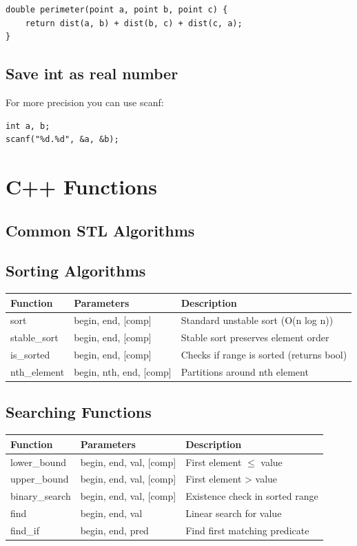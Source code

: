 \documentclass[10pt]{article}
\begin{document}
\begin{multicols*}{2}
\begin{lstlisting}[style=compactcpp]
double perimeter(point a, point b, point c) {
    return dist(a, b) + dist(b, c) + dist(c, a);
}
\end{lstlisting}

\subsection{Save int as real number}
For more precision you can use scanf:
\begin{lstlisting}[style=compactcpp]
int a, b;
scanf("%d.%d", &a, &b);
\end{lstlisting}

\section{C++ Functions}
\subsection{Common STL Algorithms}

\subsection*{Sorting Algorithms}
\begin{tabularx}{\linewidth}{|l|l|X|}
    \hline
    \textbf{Function} & \textbf{Parameters} & \textbf{Description} \\
    \hline
    sort & begin, end, [comp] & Standard unstable sort (O(n log n)) \\
    \hline
    stable\_sort & begin, end, [comp] & Stable sort preserves element order \\
    \hline
    is\_sorted & begin, end, [comp] & Checks if range is sorted (returns bool) \\
    \hline
    nth\_element & begin, nth, end, [comp] & Partitions around nth element \\
    \hline
\end{tabularx}

\subsection*{Searching Functions}
\begin{tabularx}{\linewidth}{|l|l|X|}
    \hline
    \textbf{Function} & \textbf{Parameters} & \textbf{Description} \\
    \hline
    lower\_bound & begin, end, val, [comp] & First element $\leq$ value \\
    \hline
    upper\_bound & begin, end, val, [comp] & First element > value \\
    \hline
    binary\_search & begin, end, val, [comp] & Existence check in sorted range \\
    \hline
    find & begin, end, val & Linear search for value \\
    \hline
    find\_if & begin, end, pred & Find first matching predicate \\
    \hline
\end{tabularx}


\end{multicols*}
\end{document}

